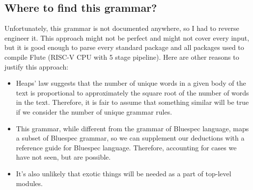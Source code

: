 \documentclass[12pt]{report}
\begin{document}
\subsection{Where to find this grammar?}  
Unfortunately, this grammar is not documented anywhere, so I had to reverse engineer it. This approach might not be perfect and might not cover every input, but it is good enough to parse every standard package and all packages used to compile Flute (RISC-V CPU with 5 stage pipeline).  
Here are other reasons to justify this approach:  
\begin{itemize}  
   \item Heaps' law suggests that the number of unique words in a given body of the text is proportional to approximately the square root of the number of words in the text. Therefore, it is fair to assume that something similar will be true if we consider the number of unique grammar rules.  
   \item This grammar, while different from the grammar of Bluespec language, maps a subset of Bluespec grammar, so we can supplement our deductions with a reference guide for Bluespec language. Therefore, accounting for cases we have not seen, but are possible.  
   \item It's also unlikely that exotic things will be needed as a part of top-level modules. 
\end{itemize}
\end{document}
